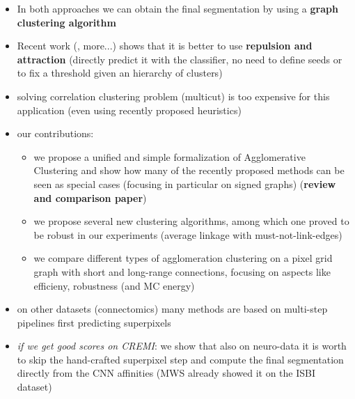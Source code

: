 \begin{itemize}
\item In both approaches we can obtain the final segmentation by using a \textbf{graph clustering algorithm}
\item Recent work (\cite{wolf2018mutex}, more...) shows that it is better to use \textbf{repulsion and attraction} (directly predict it with the classifier, no need to define seeds or to fix a threshold given an hierarchy of clusters)
\item solving correlation clustering problem (multicut) is too expensive for this application (even using recently proposed heuristics)
\item our contributions:
\begin{itemize}
\item we propose a unified and simple formalization of Agglomerative Clustering and show how many of the recently proposed methods can be seen as special cases (focusing in particular on signed graphs) (\textbf{review and comparison paper})
\item we propose several new clustering algorithms, among which one proved to be robust in our experiments (average linkage with must-not-link-edges)
\item we compare different types of agglomeration clustering on a pixel grid graph with short and long-range connections, focusing on aspects like efficieny, robustness (and MC energy) 

\end{itemize}
\item on other datasets (connectomics) many methods are based on multi-step pipelines first predicting superpixels
\item \textit{if we get good scores on CREMI}: we show that also on neuro-data it is worth to skip the hand-crafted superpixel step and compute the final segmentation directly from the CNN affinities (MWS already showed it on the ISBI dataset)

\end{itemize}
